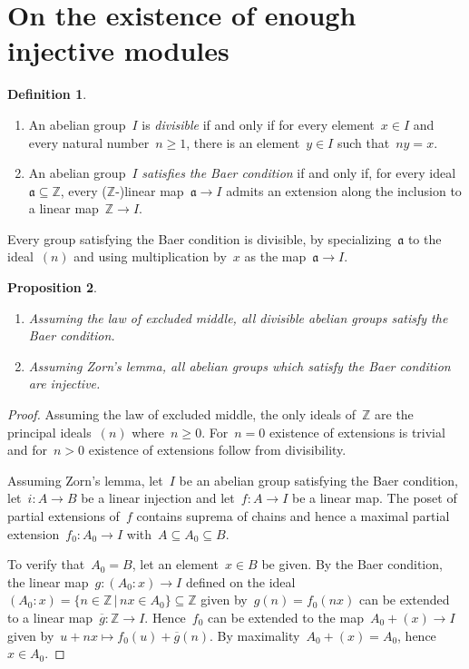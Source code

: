 \documentclass[oneside]{amsart}
\theoremstyle{definition}
\newtheorem{defn}{Definition}[section]
\theoremstyle{plain}
\newtheorem{prop}[defn]{Proposition}
\theoremstyle{remark}
\newcommand{\aaa}{\mathfrak{a}}
\newcommand{\ZZ}{\mathbb{Z}}
\renewcommand{\_}{\mathpunct{.}\,}
\begin{document}
\printbibliography
\enlargethispage{1em}

\appendix

\section{On the existence of enough injective modules}
\label{sect:enough-injective-modules}

\begin{defn}\begin{enumerate}
\item An abelian group~$I$ is \emph{divisible} if and only if for every
element~$x \in I$ and every natural number~$n \geq 1$, there is an element~$y \in I$
such that~$ny = x$.
\item An abelian group~$I$ \emph{satisfies the Baer condition} if and only if,
for every ideal~$\aaa \subseteq \ZZ$, every ($\ZZ$-)linear map~$\aaa \to I$
admits an extension along the inclusion to a linear map~$\ZZ \to I$.
\end{enumerate}
\end{defn}

Every group satisfying the Baer condition is divisible, by specializing~$\aaa$
to the ideal~$(n)$ and using multiplication by~$x$ as the map~$\aaa \to I$.

\begin{prop}
\label{prop:embed1}
\begin{enumerate}
\item Assuming the law of excluded middle, all divisible abelian groups satisfy
the Baer condition.
\item Assuming Zorn's lemma, all abelian groups which satisfy the Baer condition
are injective.
\end{enumerate}
\end{prop}

\begin{proof}Assuming the law of excluded middle, the only ideals of~$\ZZ$ are
the principal ideals~$(n)$ where~$n \geq 0$. For~$n = 0$ existence of
extensions is trivial and for~$n > 0$ existence of extensions follow from
divisibility.

Assuming Zorn's lemma, let~$I$ be an abelian group satisfying the Baer
condition, let~$i : A \to B$ be a linear injection and let~$f : A \to I$ be a
linear map. The poset of partial extensions of~$f$ contains suprema of chains and
hence a maximal partial extension~$f_0 : A_0 \to I$ with~$A \subseteq A_0
\subseteq B$.

To verify that~$A_0 = B$, let an element~$x \in B$ be given.
By the Baer condition, the linear map~$g : (A_0 : x) \to I$ defined on the
ideal~$(A_0 : x) = \{ n \in \ZZ \,|\, nx \in A_0 \} \subseteq \ZZ$ given by~$g(n) =
f_0(nx)$ can be extended to a linear map~$\overline{g} : \ZZ \to I$.
Hence~$f_0$ can be extended to the map~$A_0 + (x) \to I$ given by~$u + nx
\mapsto f_0(u) + \overline{g}(n)$. By maximality~$A_0 + (x) = A_0$, hence~$x \in A_0$.
\end{proof}
\end{document}
